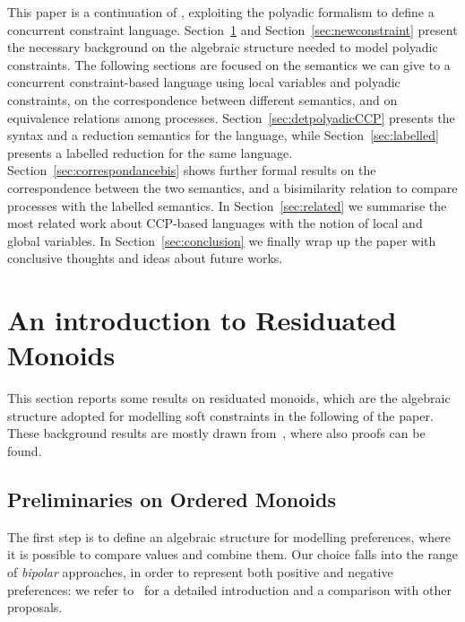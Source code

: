 \documentclass{llncs}
\begin{document}
This paper is a continuation of \cite{festcatuscia}, exploiting the polyadic formalism to define a concurrent constraint language.
Section~\ref{sec:bg}  
and Section~\ref{sec:newconstraint} present the necessary background on the algebraic structure needed to model polyadic constraints. 
The following sections are focused on the semantics we can give to a concurrent constraint-based language using local variables and polyadic constraints, on the correspondence between different semantics, and on  equivalence relations among processes.
Section~\ref{sec:detpolyadicCCP} presents the syntax and a  reduction semantics for the language, while Section~\ref{sec:labelled} presents a labelled reduction for the same language.
Section~\ref{sec:correspondancebis} shows further formal results on the correspondence between the two semantics, and a bisimilarity relation to compare processes with the labelled semantics. 
In Section~\ref{sec:related} we summarise the most related work about CCP-based languages with the notion of local and global variables.
In Section~\ref{sec:conclusion} we finally wrap up the paper with conclusive thoughts and ideas about future works.

\section{An introduction to Residuated Monoids}\label{sec:bg}

This section reports some results on residuated monoids,
which are the algebraic structure adopted for modelling
soft constraints in the following of the paper.
These background results are mostly drawn from~\cite{jlamp17}, where also proofs can be found.


\subsection{Preliminaries on Ordered Monoids}\label{sec:lem}

The first step is to define an algebraic structure for modelling preferences,
where it is possible to compare values and combine them.
Our choice falls into the range of \emph{bipolar} approaches, in order 
to represent both positive and negative preferences: 
we refer to~\cite{ipl17} for a detailed introduction and 
a comparison with other proposals.
\end{document}
